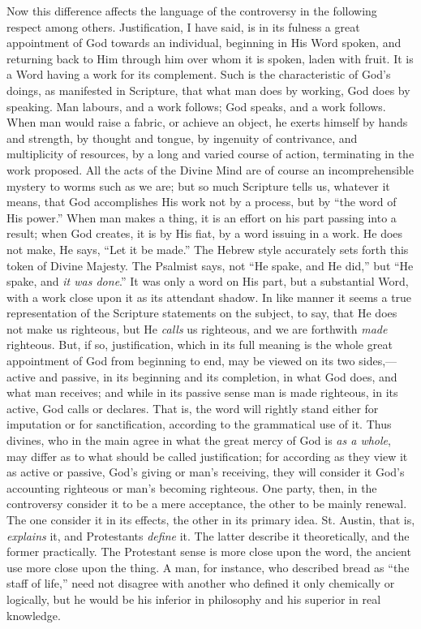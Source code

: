 Now this difference affects the language of the controversy in the
following respect among others. Justification, I have said, is in its
fulness a great appointment of God towards an individual, beginning in
His Word spoken, and returning back to Him through him over whom
it is spoken, laden with fruit. It is a Word having a work for its
complement. Such is the characteristic of God's doings, as manifested
in Scripture, that what man does by working, God does by speaking. Man
labours, and a work follows; God speaks, and a work follows. When man
would raise a fabric, or achieve an object, he exerts himself by hands
and strength, by thought and tongue, by ingenuity of contrivance, and
multiplicity of resources, by a long and varied course of action,
terminating in the work proposed. All the acts of the Divine Mind are
of course an incomprehensible mystery to worms such as we are; but so
much Scripture tells us, whatever it means, that God accomplishes His
work not by a process, but by ``the word of His power.'' When
man makes a thing, it is an effort on his part passing into a result;
when God creates, it is by His fiat, by a word issuing in a work. He
does not make, He says, ``Let it be made.'' The Hebrew style
accurately sets forth this token of Divine Majesty. The Psalmist says,
not ``He spake, and He did,'' but ``He spake, and \emph{it
was done}.'' It was only a word on His part, but a substantial
Word, with a work close upon it as its attendant shadow. In like
manner it seems a true representation of the Scripture statements on
the subject, to say, that He does not make us righteous, but He \emph{calls}
us righteous, and we are forthwith \emph{made} righteous. But, if so,
justification, which in its full meaning is the whole great
appointment of God from beginning to end, may be viewed on its two
sides,—active and passive, in its beginning and its completion, in
what God does, and what man receives; and while in its passive sense
man is made righteous, in its active, God calls or declares. That
is, the word will rightly stand either for imputation or for
sanctification, according to the grammatical use of it. Thus divines,
who in the main agree in what the great mercy of God is \emph{as a whole},
may differ as to what should be called justification; for according as
they view it as active or passive, God's giving or man's receiving,
they will consider it God's accounting righteous or man's becoming
righteous. One party, then, in the controversy consider it to be a
mere acceptance, the other to be mainly renewal. The one consider it
in its effects, the other in its primary idea. St. Austin, that is, \emph{explains}
it, and Protestants \emph{define} it. The latter describe it
theoretically, and the former practically. The Protestant sense is
more close upon the word, the ancient use more close upon the thing. A
man, for instance, who described bread as ``the staff of
life,'' need not disagree with another who defined it only
chemically or logically, but he would be his inferior in philosophy
and his superior in real knowledge.

